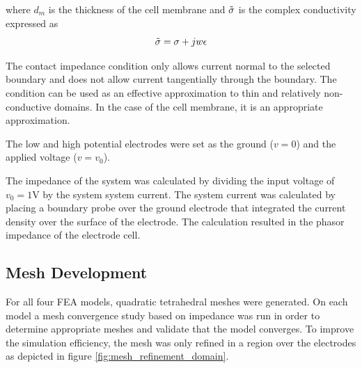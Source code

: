 where $d_m$ is the thickness of the cell membrane and $\Tilde{\sigma}$ is the complex conductivity expressed as
\begin{equation}
    \Tilde{\sigma} = \sigma + jw\epsilon 
\end{equation}

\par The contact impedance condition only allows current normal to the selected boundary and does not allow current tangentially through the boundary. The condition can be used as an effective approximation to thin and relatively non-conductive domains. In the case of the cell membrane, it is an appropriate approximation. 

\par The low and high potential electrodes were set as the ground ($v=0$) and the applied voltage ($v=v_0$).

\par The impedance of the system was calculated by dividing the input voltage of $v_0 = 1$V by the system system current. The system current was calculated by placing a boundary probe over the ground electrode that integrated the current density over the surface of the electrode. The calculation resulted in the phasor impedance of the electrode cell. 

\subsection{Mesh Development}
\par For all four FEA models, quadratic tetrahedral meshes were generated. On each model a mesh convergence study based on impedance was run in order to determine appropriate meshes and validate that the model converges. To improve the simulation efficiency, the mesh was only refined in a region over the electrodes as depicted in figure \ref{fig:mesh_refinement_domain}.

